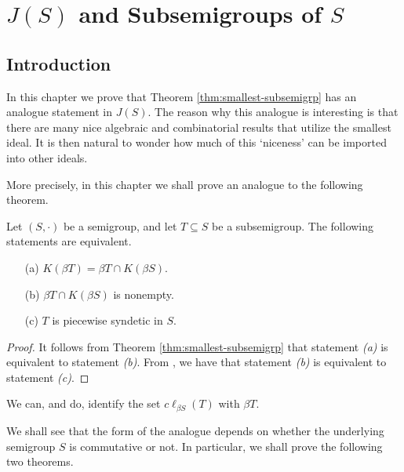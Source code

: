 
\chapter{$J(S)$ and Subsemigroups of $S$}
\section{Introduction}
In this chapter we prove that Theorem \ref{thm:smallest-subsemigrp} has an analogue statement in $J(S)$. 
The reason why this analogue is interesting is that there are many nice algebraic and combinatorial results that utilize the smallest ideal.%
It is then natural to wonder how much of this `niceness' can be imported into other ideals.

More precisely, in this chapter we shall prove an analogue to the following theorem.

\begin{thm}
  Let $(S, \cdot)$ be a semigroup, and let $T \subseteq S$ be a subsemigroup.
  The following statements are equivalent.
  \begin{itemize}
    \item[(a)] 
      $K(\beta T) = \beta T \cap K(\beta S)$.
    
    \item[(b)]
      $\beta T \cap K(\beta S)$ is nonempty.

    \item[(c)]
      $T$ is piecewise syndetic in $S$.
  \end{itemize}
\end{thm}
\begin{proof}
  It follows from Theorem \ref{thm:smallest-subsemigrp} that statement \textsl{(a)} is equivalent to statement \textsl{(b)}.
  From \cite[Theorem 4.40]{Hindman:1998fk}, we have that statement \textsl{(b)} is equivalent to statement \textsl{(c)}.
\end{proof}
\begin{rmk}
  We can, and do, identify the set $c \ell_{\beta S}(T)$ with $\beta T$. 
\end{rmk}

We shall see that the form of the analogue depends on whether the underlying semigroup $S$ is commutative or not. 
In particular, we shall prove the following two theorems.

